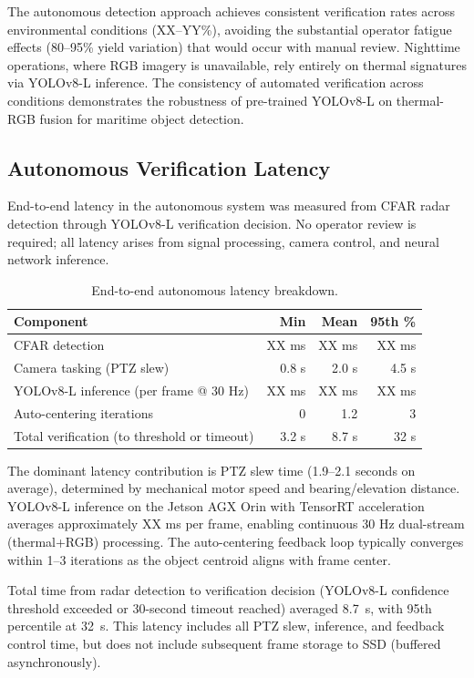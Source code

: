 \documentclass[twocolumn, 10pt]{article}
\begin{document}
The autonomous detection approach achieves consistent verification rates across environmental conditions (XX--YY\%), avoiding the substantial operator fatigue effects (80--95\% yield variation) that would occur with manual review. Nighttime operations, where RGB imagery is unavailable, rely entirely on thermal signatures via YOLOv8-L inference. The consistency of automated verification across conditions demonstrates the robustness of pre-trained YOLOv8-L on thermal-RGB fusion for maritime object detection.

\subsection{Autonomous Verification Latency}

End-to-end latency in the autonomous system was measured from CFAR radar detection through YOLOv8-L verification decision. No operator review is required; all latency arises from signal processing, camera control, and neural network inference.

\begin{table}[t]
\caption{End-to-end autonomous latency breakdown.}
\label{tab:latency_autonomous}
\centering
\small
\begin{tabular}{@{}lrrr@{}}
\toprule
Component & Min & Mean & 95th \% \\
\midrule
CFAR detection & XX ms & XX ms & XX ms \\
Camera tasking (PTZ slew) & 0.8 s & 2.0 s & 4.5 s \\
YOLOv8-L inference (per frame @ 30 Hz) & XX ms & XX ms & XX ms \\
Auto-centering iterations & 0 & 1.2 & 3 \\
Total verification (to threshold or timeout) & 3.2 s & 8.7 s & 32 s \\
\bottomrule
\end{tabular}
\end{table}

The dominant latency contribution is PTZ slew time (1.9--2.1 seconds on average), determined by mechanical motor speed and bearing/elevation distance. YOLOv8-L inference on the Jetson AGX Orin with TensorRT acceleration averages approximately XX ms per frame, enabling continuous 30 Hz dual-stream (thermal+RGB) processing. The auto-centering feedback loop typically converges within 1--3 iterations as the object centroid aligns with frame center.

Total time from radar detection to verification decision (YOLOv8-L confidence threshold exceeded or 30-second timeout reached) averaged \SI{8.7}{s}, with 95th percentile at \SI{32}{s}. This latency includes all PTZ slew, inference, and feedback control time, but does not include subsequent frame storage to SSD (buffered asynchronously).
\end{document}
